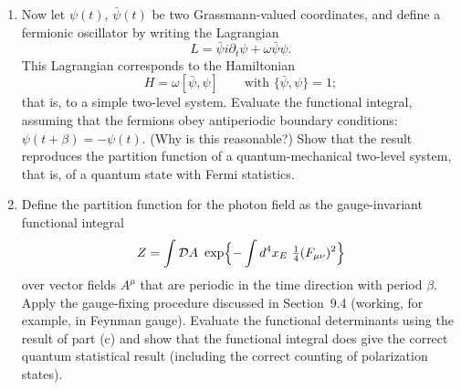 \begin{enumerate}[label=(\alph*)]
    the dependence on $m^2$ is unambiguous.  (More generally, one can usually
    evaluate the variation of a functional determinant with respect to any
    explicit parameter in the Lagrangian.)  Show that the determinant indeed
    reproduces the partition function for relativistic scalar particles.
  \item Now let $\psi(t)$, $\bar{\psi}(t)$ be two Grassmann-valued
    coordinates, and define a fermionic oscillator by writing the Lagrangian
    \begin{equation}
      L = \bar{\psi}i\partial_t\psi + \omega\bar{\psi}\psi .
    \end{equation}
    This Lagrangian corresponds to the Hamiltonian
    \begin{equation}
      H = \omega[\bar{\psi}, \psi] \qquad\text{with } \{\bar{\psi},\psi\}=1;
    \end{equation}
    that is, to a simple two-level system.  Evaluate the functional integral,
    assuming that the fermions obey antiperiodic boundary conditions:
    $\psi(t+\beta) = -\psi(t)$.  (Why is this reasonable?)  Show that the
    result reproduces the partition function of a quantum-mechanical two-level
    system, that is, of a quantum state with Fermi statistics.
  \item Define the partition function for the photon field as the
    gauge-invariant functional integral
    \begin{equation}
      Z = \int \mathcal{D}A\ \exp\Bigl\{ -\int d^4x_E\
        \tfrac{1}{4}(F_{\mu\nu})^2 \Bigr\}
    \end{equation}
    over vector fields $A^\mu$ that are periodic in the time direction with
    period $\beta$.  Apply the gauge-fixing procedure discussed in
    Section~9.4 (working, for example, in Feynman gauge).  Evaluate the
    functional determinants using the result of part (c) and show that the
    functional integral does give the correct quantum statistical result
    (including the correct counting of polarization states).
\end{enumerate}
